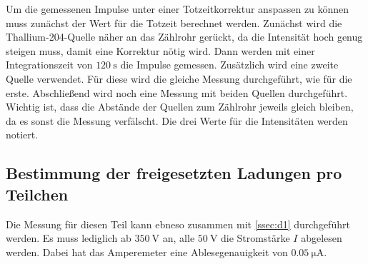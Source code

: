 Um die gemessenen Impulse unter einer Totzeitkorrektur anspassen zu können muss zunächst der Wert für die Totzeit berechnet werden.
Zunächst wird die Thallium-204-Quelle näher an das Zählrohr gerückt, da die Intensität hoch genug steigen muss, damit eine Korrektur nötig wird.
Dann werden mit einer Integrationszeit von $\SI{120}{\second}$ die Impulse gemessen.
Zusätzlich wird eine zweite Quelle verwendet.
Für diese wird die gleiche Messung durchgeführt, wie für die erste.
Abschließend wird noch eine Messung mit beiden Quellen durchgeführt.
Wichtig ist, dass die Abstände der Quellen zum Zählrohr jeweils gleich bleiben, da es sonst die Messung verfälscht.
Die drei Werte für die Intensitäten werden notiert.

\subsection{Bestimmung der freigesetzten Ladungen pro Teilchen}
\label{ssec:d3}

Die Messung für diesen Teil kann ebneso zusammen mit \autoref{ssec:d1} durchgeführt werden.
Es muss lediglich ab $\SI{350}{\volt}$ an, alle $\SI{50}{\volt}$ die Stromstärke $I$ abgelesen werden.
Dabei hat das Amperemeter eine Ablesegenauigkeit von $\SI{0.05}{\micro\ampere}$.